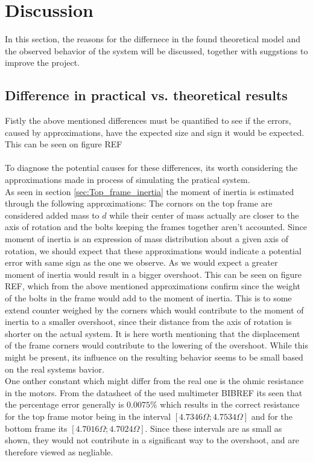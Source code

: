 \documentclass[../../main]{subfiles}
\begin{document}
\section{Discussion}
\label{sec:discussion}
In this section, the reasons for the differnece in the found theoretical model and the observed behavior of the system will be discussed, together with suggstions to improve the project.
\subsection{Difference in practical vs. theoretical results}
Fistly the above mentioned differences must be quantified to see if the errors, caused by approximations, have the expected size and sign it would be expected. This can be seen on figure REF\\
\\
To diagnose the potential causes for these differences, its worth considering the approximations made in process of simulating the pratical system.\\
As seen in section \ref{sec:Top_frame_inertia} the moment of inertia is estimated through the following approximations: The cornors on the top frame are considered added mass to $d$ while their center of mass actually are closer to the axis of rotation and the bolts keeping the frames together aren't accounted. Since moment of inertia is an expression of mass distribution about a given axis of rotation, we should expect that these approximations would indicate a potential error with same sign as the one we observe. As we would expect a greater moment of inertia would result in a bigger overshoot. This can be seen on figure REF, which from the above mentioned approximations confirm since the weight of the bolts in the frame would add to the moment of inertia. This is to some extend counter weighed by the corners which would contribute to the moment of inertia to a smaller overshoot, since their distance from the axis of rotation is shorter on the actual system. It is here worth mentioning that the displacement of the frame corners would contribute to the lowering of the overshoot. While this might be present, its influence on the resulting behavior seems to be small based on the real systems bavior.\\
One onther constant which might differ from the real one is the ohmic resistance in the motors. From the datasheet of the used multimeter BIBREF its seen that the percentage error generally is $0.0075\%$ which results in the correct resistance for the top frame motor being in the interval $[4.7346\Omega;4.7534\Omega]$ and for the bottom frame its $[4.7016\Omega;4.7024\Omega]$. Since these intervals are as small as shown, they would not contribute in a significant way to the overshoot, and are therefore viewed as negliable.\\
\end{document}
